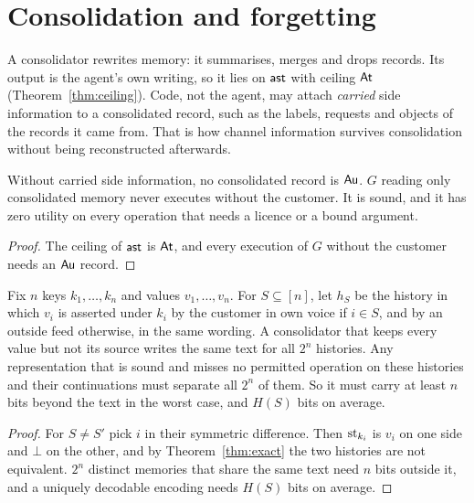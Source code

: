 \section{Consolidation and forgetting}\label{sec:consolidation}

A consolidator rewrites memory: it summarises, merges and drops records. Its output is the agent's
own writing, so it lies on $\mathsf{ast}$ with ceiling $\mathsf{At}$ (Theorem~\ref{thm:ceiling}). Code, not the
agent, may attach \emph{carried} side information to a consolidated record, such as the labels,
requests and objects of the records it came from. That is how channel information survives
consolidation without being reconstructed afterwards.

\begin{proposition}\label{prop:consolidated}
Without carried side information, no consolidated record is $\mathsf{Au}$. $G$ reading only consolidated
memory never executes without the customer. It is sound, and it has zero utility on every
operation that needs a licence or a bound argument.
\end{proposition}
\begin{proof}
The ceiling of $\mathsf{ast}$ is $\mathsf{At}$, and every execution of $G$ without the customer needs an $\mathsf{Au}$
record.
\end{proof}

\begin{theorem}\label{thm:bits}
Fix $n$ keys $k_1, \dots, k_n$ and values $v_1, \dots, v_n$. For $S \subseteq [n]$, let $h_S$ be the
history in which $v_i$ is asserted under $k_i$ by the customer in own voice if $i \in S$, and by an
outside feed otherwise, in the same wording. A consolidator that keeps every value but not its
source writes the same text for all $2^n$ histories. Any representation that is sound and misses
no permitted operation on these histories and their continuations must separate all $2^n$ of them.
So it must carry at least $n$ bits beyond the text in the worst case, and $H(S)$ bits on average.
\end{theorem}
\begin{proof}
For $S \neq S'$ pick $i$ in their symmetric difference. Then $\mathrm{st}_{k_i}$ is $v_i$ on one side and
$\bot$ on the other, and by Theorem~\ref{thm:exact} the two histories are not equivalent.
$2^n$ distinct memories that share the same text need $n$ bits outside it, and a uniquely
decodable encoding needs $H(S)$ bits on average.
\end{proof}

